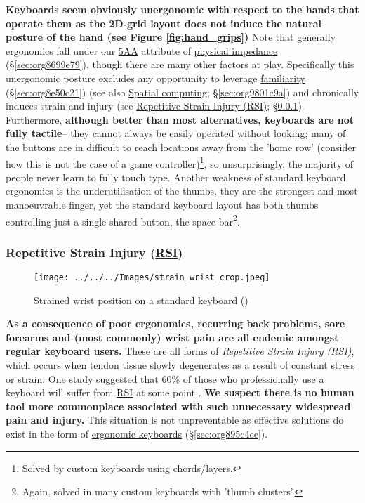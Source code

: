 \documentclass[logo,bsc,singlespacing,parskip]{infthesis}
\begin{document}
\textbf{Keyboards seem obviously unergonomic with respect to the hands that operate them as the 2D-grid layout does not induce the natural posture of the hand (see Figure \ref{fig:hand_grips})}
Note that generally ergonomics fall under our \hyperref[org2644eb5]{5AA} attribute of \hyperref[sec:org8699e79]{physical impedance} (\S \ref{sec:org8699e79}), though there are many other factors at play.
Specifically this unergonomic posture excludes any opportunity to leverage \hyperref[sec:org8e50c21]{familiarity} (\S \ref{sec:org8e50c21})
(see also \hyperref[sec:org9801c9a]{Spatial computing}; \S \ref{sec:org9801c9a}) and chronically induces strain and injury (see \hyperref[sec:org6d70a7d]{Repetitive Strain Injury (RSI)}; \S \ref{sec:org6d70a7d}).
Furthermore, \textbf{although better than most alternatives, keyboards are not fully tactile}-- they cannot always be easily operated without looking; many of the buttons are in difficult to reach locations away from the 'home row' (consider how this is not the case of a game controller)\footnote{Solved by custom keyboards using chords/layers.}, so unsurprisingly, the majority of people never learn to fully touch type.
Another weakness of standard keyboard ergonomics is the underutilisation of the thumbs,  they are the strongest and most manoeuvrable finger, yet the standard keyboard layout has both thumbs controlling just a single shared button, the space bar\footnote{Again, solved in many custom keyboards with 'thumb clusters'.}.

\subsubsection{Repetitive Strain Injury (\hyperref[org77f0234]{RSI})}
\label{sec:org6d70a7d}
\begin{figure}[h]
\centering
\texttt{[image: ../../../Images/strain\_wrist\_crop.jpeg]}
\caption{Strained wrist position on a standard keyboard (\autocite{ZergoFreedomErgonomics})}
\end{figure}

\textbf{As a consequence of  poor ergonomics, recurring back problems, sore forearms and (most commonly) wrist pain are all endemic amongst regular keyboard users.}
These are all forms of \emph{Repetitive Strain Injury (\label{org77f0234}RSI)}, which   occurs when tendon tissue slowly degenerates as a result of constant stress or strain.
One study suggested that 60\% of those who professionally use a keyboard will suffer from \hyperref[org77f0234]{RSI} at some point \autocite{namayandegiEVALUATIONMETHODWHICH2015}.
\textbf{We suspect there is no human tool more commonplace associated with such unnecessary widespread pain and injury.}
This situation is not unpreventable as effective solutions do exist in the form of \hyperref[sec:org895c4cc]{ergonomic keyboards} (\S \ref{sec:org895c4cc}).
\end{document}
